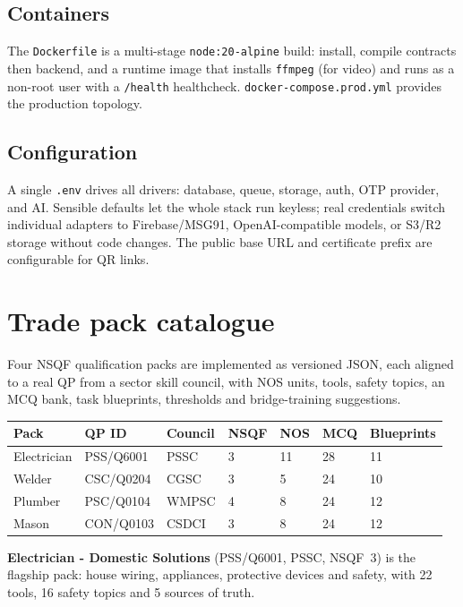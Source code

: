 \documentclass[11pt,a4paper]{article}
\newcommand{\code}[1]{\texttt{\small #1}}
\begin{document}
\subsection{Containers}
The \code{Dockerfile} is a multi-stage \code{node:20-alpine} build: install,
compile contracts then backend, and a runtime image that installs
\code{ffmpeg} (for video) and runs as a non-root user with a
\code{/health} healthcheck. \code{docker-compose.prod.yml} provides the
production topology.

\subsection{Configuration}
A single \code{.env} drives all drivers: database, queue, storage, auth,
OTP provider, and AI. Sensible defaults let the whole stack run keyless; real
credentials switch individual adapters to Firebase/MSG91, OpenAI-compatible
models, or S3/R2 storage without code changes. The public base URL and
certificate prefix are configurable for QR links.

\section{Trade pack catalogue}
Four NSQF qualification packs are implemented as versioned JSON, each aligned
to a real QP from a sector skill council, with NOS units, tools, safety
topics, an MCQ bank, task blueprints, thresholds and bridge-training
suggestions.

\begin{center}
\small
\begin{tabular}{L{2.4cm}L{2.2cm}L{3.6cm}L{1.1cm}L{1.1cm}L{1.2cm}L{1.9cm}}
\toprule
\textbf{Pack} & \textbf{QP ID} & \textbf{Council} & \textbf{NSQF} & \textbf{NOS} & \textbf{MCQ} & \textbf{Blueprints} \\
\midrule
Electrician & PSS/Q6001 & PSSC & 3 & 11 & 28 & 11 \\
Welder & CSC/Q0204 & CGSC & 3 & 5 & 24 & 10 \\
Plumber & PSC/Q0104 & WMPSC & 4 & 8 & 24 & 12 \\
Mason & CON/Q0103 & CSDCI & 3 & 8 & 24 & 12 \\
\bottomrule
\end{tabular}
\end{center}

\noindent\textbf{Electrician - Domestic Solutions} (PSS/Q6001, PSSC, NSQF~3) is
the flagship pack: house wiring, appliances, protective devices and safety,
with 22 tools, 16 safety topics and 5 sources of truth.
\end{document}
